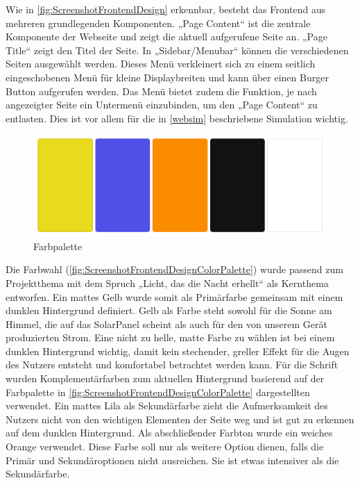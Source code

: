 Wie in \autoref{fig:ScreenshotFrontendDesign} erkennbar, besteht das Frontend aus mehreren grundlegenden Komponenten. „Page Content“ ist die zentrale Komponente der Webseite  und zeigt die aktuell aufgerufene Seite an. „Page Title“ zeigt den Titel der Seite.
In „Sidebar/Menubar“ können die verschiedenen Seiten ausgewählt werden.
Dieses Menü verkleinert sich zu einem seitlich eingeschobenen Menü für kleine Displaybreiten und kann über einen Burger Button aufgerufen werden.
Das Menü bietet zudem die Funktion, je nach angezeigter Seite ein Untermenü einzubinden, um den „Page Content“ zu entlasten.
Dies ist vor allem für die in \autoref{websim} beschriebene Simulation wichtig.

\begin{figure}[htpb] %
    \centering
    \includegraphics[width=\textwidth,keepaspectratio=true]{pics/Color_Palette_Frontend.png}
    \caption{Farbpalette}
    \label{fig:ScreenshotFrontendDesignColorPalette}
\end{figure}

Die Farbwahl (\autoref{fig:ScreenshotFrontendDesignColorPalette}) wurde passend zum Projektthema mit dem Spruch „Licht, das die Nacht erhellt“ als Kernthema entworfen. Ein mattes Gelb wurde somit als Primärfarbe gemeinsam mit einem dunklen Hintergrund definiert. Gelb als Farbe steht sowohl für die Sonne am Himmel, die auf das SolarPanel scheint als auch für den von unserem Gerät produzierten Strom. Eine nicht zu helle, matte Farbe zu wählen ist bei einem dunklen Hintergrund wichtig, damit kein stechender, greller Effekt für die Augen des Nutzers entsteht und komfortabel betrachtet werden kann.
Für die Schrift wurden Komplementärfarben zum aktuellen Hintergrund basierend auf der Farbpalette in \autoref{fig:ScreenshotFrontendDesignColorPalette} dargestellten verwendet. Ein mattes Lila als Sekundärfarbe zieht die Aufmerksamkeit des Nutzers nicht von den wichtigen Elementen der Seite weg und ist gut zu erkennen auf dem dunklen Hintergrund. Als abschließender Farbton wurde ein weiches Orange verwendet. Diese Farbe soll nur als weitere Option dienen, falls die Primär und Sekundäroptionen nicht ausreichen. Sie ist etwas intensiver als die Sekundärfarbe.

